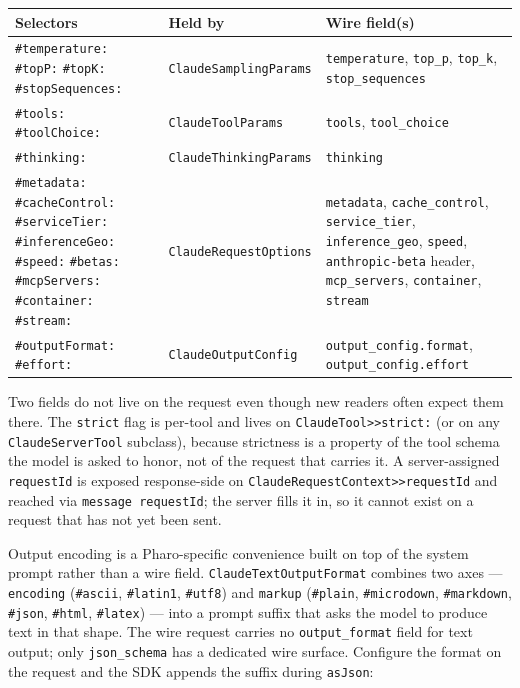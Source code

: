 \documentclass[a4paper,10pt,fleqn]{article}
\newcommand{\cls}[1]{\texttt{#1}}
\newcommand{\sel}[1]{\texttt{\##1}}
\begin{document}
\begin{center}
\small
\begin{tabular}{@{}p{4.2cm}lp{4.8cm}@{}}
\toprule
\textbf{Selectors} & \textbf{Held by} & \textbf{Wire field(s)} \\
\midrule
\sel{temperature:} \sel{topP:} \sel{topK:} \sel{stopSequences:}
   & \cls{ClaudeSamplingParams}
   & \texttt{temperature}, \texttt{top\_p}, \texttt{top\_k}, \texttt{stop\_sequences} \\
\sel{tools:} \sel{toolChoice:}
   & \cls{ClaudeToolParams}
   & \texttt{tools}, \texttt{tool\_choice} \\
\sel{thinking:}
   & \cls{ClaudeThinkingParams}
   & \texttt{thinking} \\
\sel{metadata:} \sel{cacheControl:} \sel{serviceTier:} \sel{inferenceGeo:} \sel{speed:} \sel{betas:} \sel{mcpServers:} \sel{container:} \sel{stream:}
   & \cls{ClaudeRequestOptions}
   & \texttt{metadata}, \texttt{cache\_control}, \texttt{service\_tier}, \texttt{inference\_geo}, \texttt{speed}, \texttt{anthropic-beta} header, \texttt{mcp\_servers}, \texttt{container}, \texttt{stream} \\
\sel{outputFormat:} \sel{effort:}
   & \cls{ClaudeOutputConfig}
   & \texttt{output\_config.format}, \texttt{output\_config.effort} \\
\bottomrule
\end{tabular}
\end{center}

Two fields do not live on the request even though new readers
often expect them there.  The \texttt{strict} flag is per-tool
and lives on \texttt{ClaudeTool>>strict:} (or on any
\texttt{ClaudeServerTool} subclass), because strictness is a
property of the tool schema the model is asked to honor, not of
the request that carries it.  A server-assigned
\texttt{requestId} is exposed response-side on
\texttt{ClaudeRequestContext>>requestId} and reached via
\texttt{message requestId}; the server fills it in, so it cannot
exist on a request that has not yet been sent.

Output encoding is a Pharo-specific convenience built on top of
the system prompt rather than a wire field.
\cls{ClaudeTextOutputFormat} combines two axes --- \texttt{encoding}
(\sel{ascii}, \sel{latin1}, \sel{utf8}) and \texttt{markup}
(\sel{plain}, \sel{microdown}, \sel{markdown}, \sel{json},
\sel{html}, \sel{latex}) --- into a prompt suffix that asks the
model to produce text in that shape.  The wire request carries
no \texttt{output\_format} field for text output; only
\texttt{json\_schema} has a dedicated wire surface.  Configure
the format on the request and the SDK appends the suffix during
\texttt{asJson}:
\end{document}
